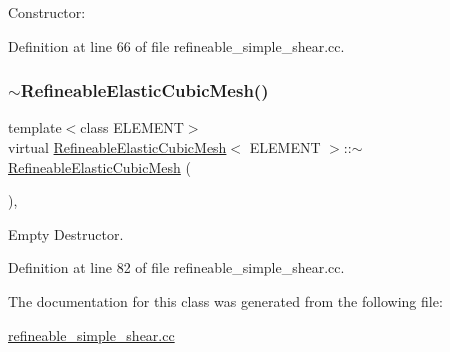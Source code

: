 Constructor\+: 



Definition at line 66 of file refineable\+\_\+simple\+\_\+shear.\+cc.

\mbox{\label{classRefineableElasticCubicMesh_a2c0edb5ea4f205077285aced94af5767}} 
\subsubsection{\texorpdfstring{$\sim$\+Refineable\+Elastic\+Cubic\+Mesh()}{~RefineableElasticCubicMesh()}}
{\footnotesize\ttfamily template$<$class E\+L\+E\+M\+E\+NT$>$ \\
virtual \hyperlink{classRefineableElasticCubicMesh}{Refineable\+Elastic\+Cubic\+Mesh}$<$ E\+L\+E\+M\+E\+NT $>$\+::$\sim$\hyperlink{classRefineableElasticCubicMesh}{Refineable\+Elastic\+Cubic\+Mesh} (\begin{DoxyParamCaption}{ }\end{DoxyParamCaption})\hspace{0.3cm}{\ttfamily [inline]}, {\ttfamily [virtual]}}



Empty Destructor. 



Definition at line 82 of file refineable\+\_\+simple\+\_\+shear.\+cc.



The documentation for this class was generated from the following file\+:\begin{DoxyCompactItemize}
\item 
\hyperlink{refineable__simple__shear_8cc}{refineable\+\_\+simple\+\_\+shear.\+cc}\end{DoxyCompactItemize}
